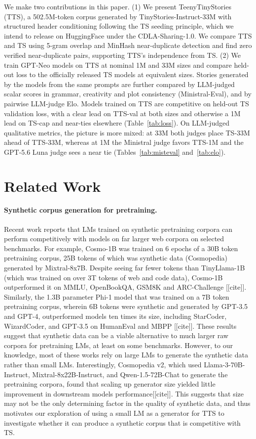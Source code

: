 \documentclass{article}
\begin{document}
We make two contributions in this paper. (1) We present TeenyTinyStories (TTS), a 502.5M-token corpus generated by TinyStories-Instruct-33M with structured header conditioning following the TS seeding principle, which we intend to release on HuggingFace under the CDLA-Sharing-1.0. We compare TTS and TS using 5-gram overlap and MinHash near-duplicate detection and find zero verified near-duplicate pairs, supporting TTS's independence from TS. (2) We train GPT-Neo models on TTS at nominal 1M and 33M sizes and compare held-out loss to the officially released TS models at equivalent sizes. Stories generated by the models from the same prompts are further compared by LLM-judged scalar scores in grammar, creativity and plot consistency (Ministral-Eval), and by pairwise LLM-judge Elo. Models trained on TTS are competitive on held-out TS validation loss, with a clear lead on TTS-val at both sizes and otherwise a 1M lead on TS-cap and near-ties elsewhere (Table~\ref{tab:loss}). On LLM-judged qualitative metrics, the picture is more mixed: at 33M both judges place TS-33M ahead of TTS-33M, whereas at 1M the Ministral judge favors TTS-1M and the GPT-5.6 Luna judge sees a near tie (Tables~\ref{tab:misteval} and~\ref{tab:elo}).


\section{Related Work}
\paragraph{Synthetic corpus generation for pretraining.} Recent work reports that LMs trained on synthetic pretraining corpora can perform competitively with models on far larger web corpora on selected benchmarks. For example, Cosmo-1B was trained on 6 epochs of a 30B token pretraining corpus, 25B tokens of which was synthetic data (Cosmopedia) generated by Mixtral-8x7B. Despite seeing far fewer tokens than TinyLlama-1B (which was trained on over 3T tokens of web and code data), Cosmo-1B outperformed it on MMLU, OpenBookQA, GSM8K and ARC-Challenge [[cite]]. Similarly, the 1.3B parameter Phi-1 model that was trained on a 7B token pretraining corpus, wherein 6B tokens were synthetic and generated by GPT-3.5 and GPT-4, outperformed models ten times its size, including StarCoder, WizardCoder, and GPT-3.5 on HumanEval and MBPP [[cite]]. These results suggest that synthetic data can be a viable alternative to much larger raw corpora for pretraining LMs, at least on some benchmarks. However, to our knowledge, most of these works rely on large LMs to generate the synthetic data rather than small LMs. Interestingly, Cosmopedia v2, which used Llama-3-70B-Instruct, Mixtral-8x22B-Instruct, and Qwen-1.5-72B-Chat to generate the pretraining corpora, found that scaling up generator size yielded little improvement in downstream models performance[[cite]]. This suggests that size may not be the only determining factor in the quality of synthetic data, and thus motivates our exploration of using a small LM as a generator for TTS to investigate whether it can produce a synthetic corpus that is competitive with TS.
\end{document}
